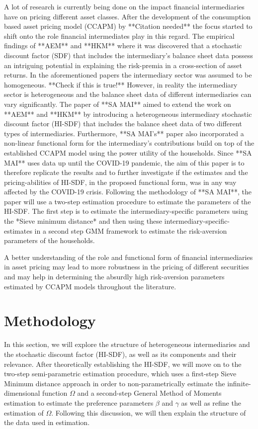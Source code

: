 \documentclass[12pt,a4paper]{article}
\begin{document}
A lot of research is currently being done on the impact financial intermediaries have on pricing different asset classes. After the development of the consumption based asset pricing model (CCAPM) by **Citation needed** the focus started to shift onto the role financial intermediates play in this regard. 
The empirical findings of **AEM** and **HKM** where it was discovered that a stochastic discount factor (SDF) that includes the intermediary's balance sheet data possess an intriguing potential in explaining the risk-premia in a cross-section of asset returns. In the aforementioned papers the intermediary sector was assumed to be homogeneous. **Check if this is true!**
However, in reality the intermediary sector is heterogeneous and the balance sheet data of different intermediaries can vary significantly. The paper of **SA MAI** aimed to extend the work on **AEM** and **HKM** by introducing a heterogeneous intermediary stochastic discount factor (HI-SDF) that includes the balance sheet data of two different types of intermediaries. Furthermore, **SA MAI's** paper also incorporated a non-linear functional form for the intermediary's contributions build on top of the established CCAPM model using the power utility of the households. 
Since **SA MAI** uses data up until the COVID-19 pandemic, the aim of this paper is to therefore replicate the results and to further investigate if the estimates and the pricing-abilities of HI-SDF, in the proposed functional form, was in any way affected by the COVID-19 crisis. 
Following the methodology of **SA MAI**, the paper will use a two-step estimation procedure to estimate the parameters of the HI-SDF.
The first step is to estimate the intermediary-specific parameters using the *Sieve minimum distance* and then using these intermediary-specific-estimates in a second step GMM framework to estimate the risk-aversion parameters of the households.

A better understanding of the role and functional form of financial intermediaries in asset pricing may lead to more robustness in the pricing of different securities and may help in determining the absurdly high risk-aversion parameters estimated by CCAPM models throughout the literature.


\newpage


\section{Methodology}

In this section, we will explore the structure of heterogeneous intermediaries and the stochastic discount factor (HI-SDF), as well as its components and their relevance. After theoretically establishing the HI-SDF, we will move on to the two-step semi-parametric estimation procedure, which uses a first-step Sieve Minimum distance approach in order to non-parametrically estimate the infinite-dimensional function $\Omega$ and a second-step General Method of Moments estimation to estimate the preference parameters $\beta$ and $\gamma$ as well as refine the estimation of $\Omega$. Following this discussion, we will then explain the structure of the data used in estimation.
\end{document}

